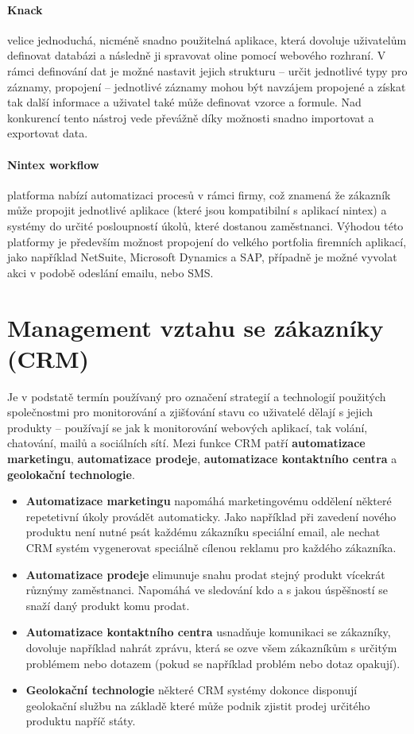 \paragraph{Knack} velice jednoduchá, nicméně snadno použitelná aplikace, která dovoluje uživatelům definovat databázi a následně ji spravovat oline pomocí webového rozhraní. V rámci definování dat je možné nastavit jejich strukturu -- určit jednotlivé typy pro záznamy, propojení -- jednotlivé záznamy mohou být navzájem propojené a získat tak další informace a uživatel také může definovat vzorce a formule. Nad konkurencí tento nástroj vede převážně díky možnosti snadno importovat a exportovat data.

\paragraph{Nintex workflow} platforma nabízí automatizaci procesů v rámci firmy, což znamená že zákazník může propojit jednotlivé aplikace (které jsou kompatibilní s aplikací nintex) a systémy do určité posloupností úkolů, které dostanou zaměstnanci. Výhodou této platformy je především možnost propojení do velkého portfolia firemních aplikací, jako například NetSuite, Microsoft Dynamics a SAP, případně je možné vyvolat akci v podobě odeslání emailu, nebo SMS.

\section{Management vztahu se zákazníky (CRM)}
\par Je v podstatě termín používaný pro označení strategií a technologií použitých společnostmi pro monitorování a zjišťování stavu co uživatelé dělají s jejich produkty -- používají se jak k monitorování webových aplikací, tak volání, chatování, mailů a sociálních sítí. Mezi funkce CRM patří \textbf{automatizace marketingu}, \textbf{automatizace prodeje}, \textbf{automatizace kontaktního centra} a \textbf{geolokační technologie}. \cite{crm}

\begin{itemize}
  \item \textbf{Automatizace marketingu} napomáhá marketingovému oddělení některé repetetivní úkoly provádět automaticky. Jako například při zavedení nového produktu není nutné psát každému zákazníku speciální email, ale nechat CRM systém vygenerovat speciálně cílenou reklamu pro každého zákazníka.
  \item \textbf{Automatizace prodeje} elimunuje snahu prodat stejný produkt vícekrát různýmy zaměstnanci. Napomáhá ve sledování kdo a s jakou úspěšností se snaží daný produkt komu prodat.
  \item \textbf{Automatizace kontaktního centra} usnadňuje komunikaci se zákazníky, dovoluje například nahrát zprávu, která se ozve všem zákazníkům s určitým problémem nebo dotazem (pokud se například problém nebo dotaz opakují).
  \item \textbf{Geolokační technologie} některé CRM systémy dokonce disponují geolokační službu na základě které může podnik zjistit prodej určitého produktu napříč státy. \cite{crm}
\end{itemize}

